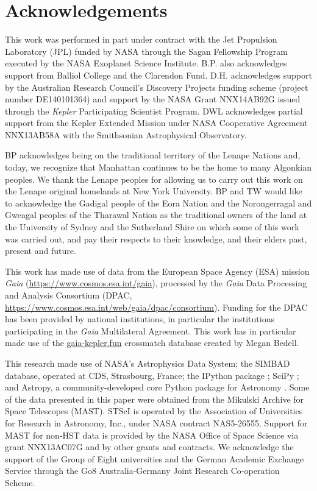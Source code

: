 \documentclass[a4paper,fleqn,usenatbib]{mnras}
\begin{document}
\section*{Acknowledgements} %

This work was performed in part under contract with the Jet Propulsion Laboratory (JPL) funded by NASA through the Sagan Fellowship Program executed by the NASA Exoplanet Science Institute. B.P. also acknowledges support from Balliol College and the Clarendon Fund. D.H. acknowledges support by the Australian Research Council's Discovery Projects funding scheme (project number DE140101364) and support by the NASA Grant NNX14AB92G issued through the \emph{Kepler} Participating Scientist Program. DWL acknowledges partial support from the Kepler Extended Mission under NASA Cooperative Agreement NNX13AB58A with the Smithsonian Astrophysical Observatory.

BP acknowledges being on the traditional territory of the Lenape Nations and, today, we recognize that Manhattan continues to be the home to many Algonkian peoples. We thank the Lenape peoples for allowing us to carry out this work on the Lenape original homelands at New York University. BP and TW would like to acknowledge the Gadigal people of the Eora Nation and the Norongerragal and Gweagal peoples of the Tharawal Nation as the traditional owners of the land at the University of Sydney and the Sutherland Shire on which some of this work was carried out, and pay their respects to their knowledge, and their elders past, present and future.

This work has made use of data from the European Space Agency (ESA) mission
{\it Gaia} (\url{https://www.cosmos.esa.int/gaia}), processed by the {\it Gaia}
Data Processing and Analysis Consortium (DPAC,
\url{https://www.cosmos.esa.int/web/gaia/dpac/consortium}). Funding for the DPAC
has been provided by national institutions, in particular the institutions
participating in the {\it Gaia} Multilateral Agreement. This work has in particular made use of the \url{gaia-kepler.fun} crossmatch database created by Megan Bedell.

This research made use of NASA's Astrophysics Data System; the SIMBAD database, operated at CDS, Strasbourg, France; the IPython package \citep{PER-GRA:2007}; SciPy \citep{jones_scipy_2001}; and Astropy, a community-developed core Python package for Astronomy \citep{astropy}. Some of the data presented in this paper were obtained from the Mikulski Archive for Space Telescopes (MAST). STScI is operated by the Association of Universities for Research in Astronomy, Inc., under NASA contract NAS5-26555. Support for MAST for non-HST data is provided by the NASA Office of Space Science via grant NNX13AC07G and by other grants and contracts. We acknowledge the support of the Group of Eight universities and the German Academic Exchange Service through the Go8 Australia-Germany Joint Research Co-operation Scheme. 
\end{document}
